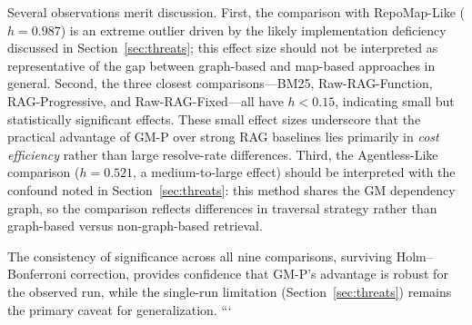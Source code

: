 \noindent
Several observations merit discussion.
First, the comparison with RepoMap-Like ($h = 0.987$) is an extreme outlier driven by the likely implementation deficiency discussed in Section~\ref{sec:threats}; this effect size should not be interpreted as representative of the gap between graph-based and map-based approaches in general.
Second, the three closest comparisons---BM25, Raw-RAG-Function, RAG-Progressive, and Raw-RAG-Fixed---all have $h < 0.15$, indicating small but statistically significant effects.
These small effect sizes underscore that the practical advantage of GM-P over strong RAG baselines lies primarily in \emph{cost efficiency} rather than large resolve-rate differences.
Third, the Agentless-Like comparison ($h = 0.521$, a medium-to-large effect) should be interpreted with the confound noted in Section~\ref{sec:threats}: this method shares the GM dependency graph, so the comparison reflects differences in traversal strategy rather than graph-based versus non-graph-based retrieval.

The consistency of significance across all nine comparisons, surviving Holm--Bonferroni correction, provides confidence that GM-P's advantage is robust for the observed run, while the single-run limitation (Section~\ref{sec:threats}) remains the primary caveat for generalization.
```
